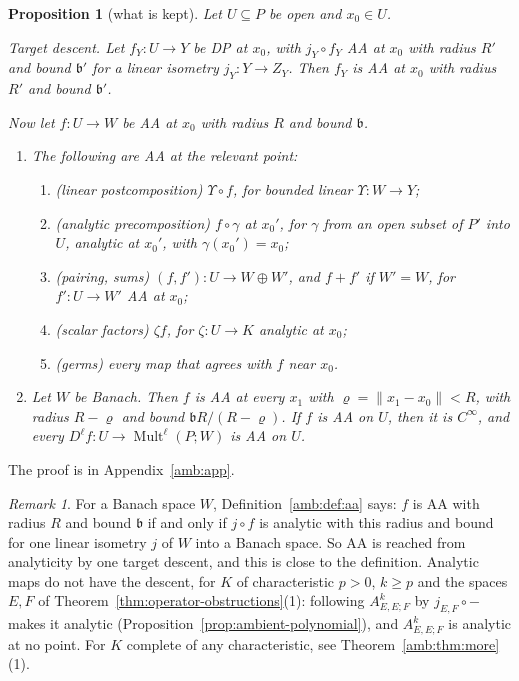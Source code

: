 \documentclass[11pt]{amsart}
\newtheorem{proposition}[theorem]{Proposition}
\theoremstyle{definition}
\theoremstyle{remark}
\newtheorem{remark}[theorem]{Remark}
\numberwithin{equation}{section}
\newcommand{\Mult}{\operatorname{Mult}}
\newcommand{\norm}[1]{\lVert #1\rVert}
\theoremstyle{plain}
\theoremstyle{definition}
\theoremstyle{plain}
\begin{document}
\begin{proposition}[what is kept]\label{amb:prop:permanence}
Let $U\subseteq P$ be open and $x_0\in U$.

\emph{Target descent.} Let $f_Y\colon U\to Y$ be DP at $x_0$, with $j_Y\circ f_Y$ AA at $x_0$ with radius $R'$ and bound $\mathfrak b'$ for a linear isometry $j_Y\colon Y\to Z_Y$. Then $f_Y$ is AA at $x_0$ with radius $R'$ and bound $\mathfrak b'$.

Now let $f\colon U\to W$ be AA at $x_0$ with radius $R$ and bound $\mathfrak b$.
\begin{enumerate}
\item The following are AA at the relevant point:
\begin{enumerate}
\item \emph{(linear postcomposition)} $\Upsilon\circ f$, for bounded linear $\Upsilon\colon W\to Y$;
\item \emph{(analytic precomposition)} $f\circ\gamma$ at $x_0'$, for $\gamma$ from an open subset of $P'$ into $U$, analytic at $x_0'$, with $\gamma(x_0')=x_0$;
\item \emph{(pairing, sums)} $(f,f')\colon U\to W\oplus W'$, and $f+f'$ if $W'=W$, for $f'\colon U\to W'$ AA at $x_0$;
\item \emph{(scalar factors)} $\zeta f$, for $\zeta\colon U\to K$ analytic at $x_0$;
\item \emph{(germs)} every map that agrees with $f$ near $x_0$.
\end{enumerate}
\item Let $W$ be Banach. Then $f$ is AA at every $x_1$ with $\varrho=\norm{x_1-x_0}<R$, with radius $R-\varrho$ and bound $\mathfrak bR/(R-\varrho)$. If $f$ is AA on $U$, then it is $C^\infty$, and every $D^\ell f\colon U\to\Mult^\ell(P;W)$ is AA on $U$.
\end{enumerate}
\end{proposition}

The proof is in Appendix~\ref{amb:app}.

\begin{remark}\label{amb:rem:descent}
For a Banach space $W$, Definition~\ref{amb:def:aa} says: $f$ is AA with radius $R$ and bound $\mathfrak b$ if and only if $j\circ f$ is analytic with this radius and bound for one linear isometry $j$ of $W$ into a Banach space. So AA is reached from analyticity by one target descent, and this is close to the definition. Analytic maps do not have the descent, for $K$ of characteristic $p>0$, $k\ge p$ and the spaces $E,F$ of Theorem~\ref{thm:operator-obstructions}(1): following $A^k_{E,E;F}$ by $j_{E,F}\circ{-}$ makes it analytic (Proposition~\ref{prop:ambient-polynomial}), and $A^k_{E,E;F}$ is analytic at no point. For $K$ complete of any characteristic, see Theorem~\ref{amb:thm:more}(1).
\end{remark}
\end{document}
